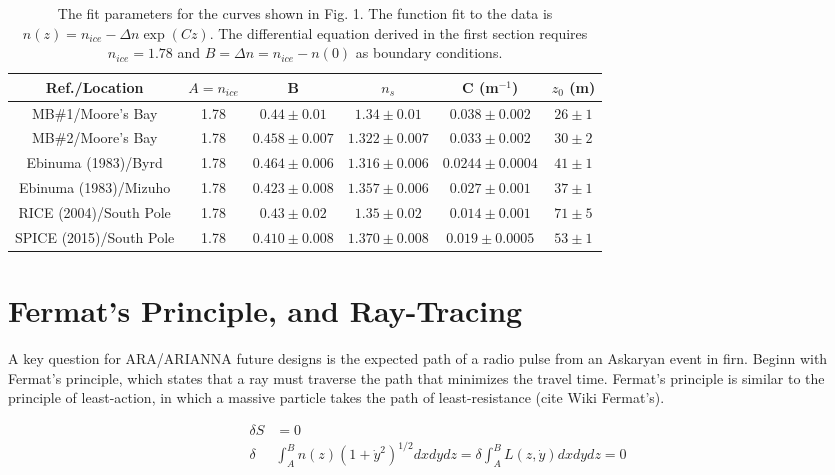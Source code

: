 \documentclass[12pt]{article}
\begin{document}
\begin{table}[ht]
\centering
\begin{tabular}{| c | c | c | c | c | c |}\hline
Ref./Location & $A=n_{ice}$ & B  & $n_s$ & C (m$^{-1}$) & $z_0$ (m)\\ \hline
MB\#1/Moore's Bay & 1.78 & $0.44\pm0.01$ & $1.34\pm0.01$ & $0.038\pm0.002$ & $26\pm1$ \\ \hline
MB\#2/Moore's Bay & 1.78 & $0.458\pm0.007$ & $1.322\pm0.007$ & $0.033\pm0.002$ & $30\pm2$ \\ \hline
Ebinuma (1983)/Byrd & 1.78 & $0.464\pm0.006$ & $1.316\pm0.006$ & $0.0244\pm0.0004$ & $41\pm1$ \\ \hline
Ebinuma (1983)/Mizuho & 1.78 & $0.423\pm0.008$ & $1.357\pm0.006$ & $0.027\pm0.001$ & $37\pm1$ \\ \hline\hline
RICE (2004)/South Pole & 1.78 & $0.43\pm0.02$ & $1.35\pm0.02$ & $0.014\pm0.001$ & $71\pm5$ \\ \hline
SPICE (2015)/South Pole & 1.78 & $0.410\pm0.008$ & $1.370\pm0.008$ & $0.019\pm0.0005$ & $53\pm1$ \\ \hline
\end{tabular}
\caption{\label{tab:tab0} The fit parameters for the curves shown in Fig. 1.  The function fit to the data is $n(z) = n_{ice} -\Delta n \exp(Cz)$.  The differential equation derived in the first section requires $n_{ice} = 1.78$ and $B = \Delta n = n_{ice} - n(0)$ as boundary conditions.}
\end{table}

\section{Fermat's Principle, and Ray-Tracing}

A key question for ARA/ARIANNA future designs is the expected path of a radio pulse from an Askaryan event in firn.  Beginn with Fermat's principle, which states that a ray must traverse the path that minimizes the travel time.  Fermat's principle is similar to the principle of least-action, in which a massive particle takes the path of least-resistance (cite Wiki Fermat's).

\begin{align}
\delta S &= 0 \\
\delta &\int_A^B n(z)(1+\dot{y}^2)^{1/2} dx dy dz = \delta \int_A^B L(z,\dot{y}) dx dy dz = 0
\end{align}
\end{document}
